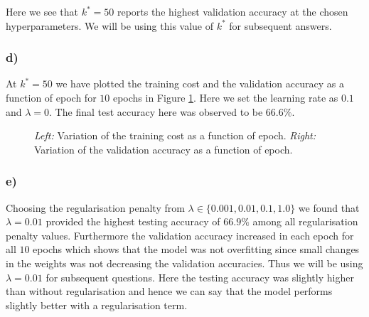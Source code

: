 \documentclass{article}
\begin{document}
Here we see that $k^*=50$ reports the highest validation accuracy at the chosen hyperparameters. We will be using this value of $k^*$ for subsequent answers.

\subsubsection*{d)}
At $k^*=50$ we have plotted the training cost and the validation accuracy as a function of epoch for $10$ epochs in Figure \ref{fig:objectives}. Here we set the learning rate as $0.1$ and $\lambda=0$. The final test accuracy here was observed to be $66.6\%$.

\begin{figure}[H]
    \centering
    \qquad
    \caption{\textit{Left:} Variation of the training cost as a function of epoch. \textit{Right:} Variation of the validation accuracy as a function of epoch.}
    \label{fig:objectives}
\end{figure}

\subsubsection*{e)}
Choosing the regularisation penalty from $\lambda\in \{0.001, 0.01, 0.1, 1.0\}$ we found that $\lambda = 0.01$ provided the highest testing accuracy of $66.9\%$ among all regularisation penalty values. Furthermore the validation accuracy increased in each epoch for all $10$ epochs which shows that the model was not overfitting since small changes in the weights was not decreasing the validation accuracies. Thus we will be using $\lambda=0.01$ for subsequent questions. Here the testing accuracy was slightly higher than without regularisation and hence we can say that the model performs slightly better with a regularisation term.
\end{document}
